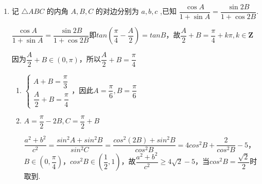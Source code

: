\begin{enumerate}
\begin{jieda}
        又 $\bigtriangleup {ABC}$ 为锐角三角形,故可得$A \in  \left( {\dfrac{\pi }{6},\dfrac{\pi }{4}}\right)$ ,则 $\cos A \in  \left( {\dfrac{\sqrt{2}}{2},\dfrac{\sqrt{3}}{2}}\right)$ ,故$\dfrac{b + {2c}}{a} \in  \left( {2\sqrt{2} + 1,2\sqrt{3} + 2}\right)$ .
    \end{jieda}
    \item 记 $\bigtriangleup  {ABC}$ 的内角 $A,B,C$ 的对边分别为 $a,b,c$ ,已知 $\dfrac{\cos A}{1 + \sin A} = \dfrac{\sin {2B}}{1 + \cos {2B}}$.
    
    \begin{jieda}
        $\dfrac{\cos A}{1 + \sin A} = \dfrac{\sin {2B}}{1 + \cos {2B}}$即$tan\left(\dfrac{\pi}{4}-\dfrac{A}{2}\right) = tanB$，故$\dfrac{A}{2}+B = \dfrac{\pi}{4} + k\pi, k \in \mathbf{Z}$

        因为$\dfrac{A}{2} + B \in \left(0, \pi\right)$，所以$\dfrac{A}{2}+B = \dfrac{\pi}{4}$
        
        \begin{enumerate}
            \item $\left\{\begin{array}{l}
                 A+B = \dfrac{\pi}{3}  \\
                 \dfrac{A}{2}+B = \dfrac{\pi}{4} 
            \end{array}\right.$，因此$A = \dfrac{\pi}{6}, B = \dfrac{\pi}{6}$
            \item $A = \dfrac{\pi}{2} - 2B, C = \dfrac{\pi}{2}+B$
            
            $\dfrac{{a}^{2} + {b}^{2}}{{c}^{2}} = \dfrac{sin^2A+sin^2B}{sin^2C} = \dfrac{cos^2(2B) + sin^2B}{cos^2B} = 4cos^2B + \dfrac{2}{cos^2B}-5$，$B \in \left(0, \dfrac{\pi}{4}\right)$，$cos^2B \in \left(\dfrac{1}{2}, 1\right)$，故$\dfrac{{a}^{2} + {b}^{2}}{{c}^{2}} \geq 4\sqrt{2} - 5$，当$cos^2B = \dfrac{\sqrt{2}}{2}$时取到.
        \end{enumerate}
    \end{jieda}
\end{enumerate}
